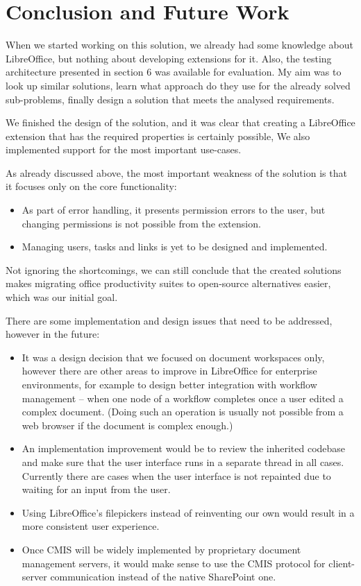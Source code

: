 \section{Conclusion and Future Work}

When we started working on this solution, we already had some knowledge about
LibreOffice, but nothing about developing extensions for it. Also, the testing
architecture presented in section 6 was available for evaluation. My aim was to
look up similar solutions, learn what approach do they use for the already
solved sub-problems, finally design a solution that meets the analysed
requirements.

We finished the design of the solution, and it was clear that creating a
LibreOffice extension that has the required properties is certainly possible,
We also implemented support for the most important use-cases.

As already discussed above, the most important weakness of the solution is that
it focuses only on the core functionality:

\begin{itemize}
\item As part of error handling, it presents permission errors to the user, but
changing permissions is not possible from the extension.
\item Managing users, tasks and links is yet to be designed and implemented.
\end{itemize}

Not ignoring the shortcomings, we can still conclude that the created solutions
makes migrating office productivity suites to open-source alternatives easier,
which was our initial goal.

There are some implementation and design issues that need to be addressed,
however in the future:

\begin{itemize}
\item It was a design decision that we focused on document workspaces only,
however there are other areas to improve in LibreOffice for enterprise
environments, for example to design better integration with workflow management
-- when one node of a workflow completes once a user edited a complex document.
(Doing such an operation is usually not possible from a web browser if the
document is complex enough.)
\item An implementation improvement would be to review the inherited codebase
and make sure that the user interface runs in a separate thread in all cases.
Currently there are cases when the user interface is not repainted due to
waiting for an input from the user.
\item Using LibreOffice's filepickers instead of reinventing our own would
result in a more consistent user experience.
\item Once CMIS will be widely implemented by proprietary document management
servers, it would make sense to use the CMIS protocol for client-server
communication instead of the native SharePoint one.
\end{itemize}
